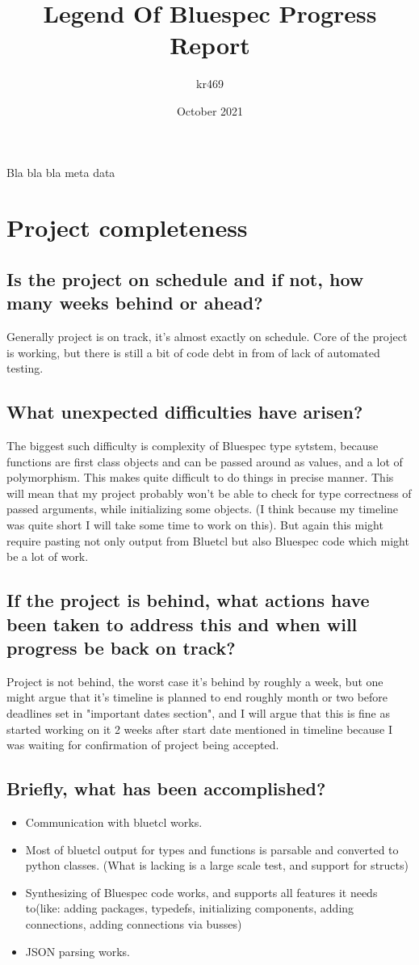 \documentclass[14pt]{article}
\title{Legend Of Bluespec Progress Report}
\author{kr469 }
\date{October 2021}
\begin{document}
    \section{}
     Bla bla bla meta data
    
\section{Project completeness}
    \subsection{Is the project on schedule and if not, how many weeks behind or ahead?}    
        Generally project is on track, it's almost exactly on schedule. Core of the project is working, but there is still a bit of code debt in from of lack of automated testing.
    \subsection{What unexpected difficulties have arisen?}
        The biggest such difficulty is complexity of Bluespec type sytstem, because functions are first class objects and can be passed around as values, and a lot of polymorphism. This makes quite difficult to do things in precise manner. This will mean that my project probably won't be able to check for type correctness of passed arguments, while initializing some objects. (I think because my timeline was quite short I will take some time to work on this). But again this might require pasting not only output from Bluetcl but also Bluespec code which might be a lot of work. 
    \subsection{If the project is behind, what actions have been taken to address this and when will progress be back on track?}
        Project is not behind, the worst case it's behind by roughly a week, but one might argue that it's timeline is planned to end roughly month or two before deadlines set in "important dates section", and I will argue that this is fine as started working on it 2 weeks after start date mentioned in timeline because I was waiting for confirmation of project being accepted. 
    \subsection{Briefly, what has been accomplished?}
    \begin{itemize}
        \item Communication with bluetcl works. 
        \item Most of bluetcl output for types and functions is parsable and converted to python classes. (What is lacking is a large scale test, and support for structs)
        \item Synthesizing of Bluespec code works, and supports all features it needs to(like: adding packages, typedefs, initializing components, adding connections, adding connections via busses)
        \item JSON parsing works. 
    \end{itemize}
        
\end{document}
